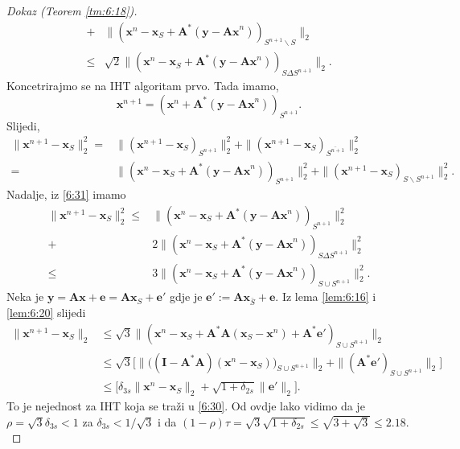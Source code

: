 \documentclass[a4paper,twoside,12pt]{memoir} %
\newcommand{\vect}[1]{\mathbf{#1}}
\renewcommand{\vec}{\vect}
\newcommand{\norm}[1]{\|{#1}\|}
\begin{document}
\begin{proof}[Dokaz (Teorem \ref{tm:6:18})]
\begin{align}
        + & \norm{(\vec x^n - \vec x_S + \vec A^*(\vec y - \vec{Ax}^n))_{S^{n+1} \backslash S}}_2 \nonumber \\
        \leq & \sqrt{2} \norm{(\vec x^n - \vec x_S + \vec A^*(\vec y - \vec{Ax}^n))_{S \Delta S^{n+1}}}_2.\label{6:31}
    \end{align}
    Koncetrirajmo se na IHT algoritam prvo. Tada imamo,
    \begin{equation*}
        \vec x^{n+1} = (\vec x^n + \vec A^*(\vec y - \vec{Ax}^n))_{S^{n+1}}.
    \end{equation*}
    Slijedi,
    \begin{align*}
        \norm{\vec x^{n+1} - \vec x_S}_2^2 = & \norm{(\vec x^{n+1} - \vec x_S)_{S^{n+1}}}_2^2 + \norm{(\vec x^{n+1} - \vec x_S)_{\overline{S^{n+1}}}}_2^2\\
        = & \norm{(\vec x^n - \vec x_S + \vec A^*(\vec y - \vec{Ax}^n))_{S^{n+1}}}_2^2 + \norm{(\vec x^{n+1} - \vec x_S)_{S \backslash S^{n+1}}}_2^2.
    \end{align*}
    Nadalje, iz \eqref{6:31} imamo
    \begin{align*}
        \norm{\vec x^{n+1} - \vec x_S}_2^2 \leq & \norm{(\vec x^n - \vec x_S + \vec A^*(\vec y - \vec{Ax}^n))_{S^{n+1}}}_2^2\\
        +&2\norm{(\vec x^n - \vec x_S + \vec A^*(\vec y - \vec{Ax}^n))_{S \Delta S^{n+1}}}_2^2 \\
        \leq & 3 \norm{(\vec x^n - \vec x_S + \vec A^* (\vec y - \vec{Ax}^n))_{S \cup S^{n+1}}}_2^2.
    \end{align*}
    Neka je $\vec y = \vec{Ax} + \vec e = \vec{Ax}_S + \vec e'$ gdje je $\vec e' := \vec {Ax}_{\bar S} + \vec e$. Iz lema \ref{lem:6:16} i \ref{lem:6:20} slijedi
    \begin{align*}
        \norm{\vec x^{n+1} - \vec x_S}_2 & \leq \sqrt{3} \norm{(\vec x^n - \vec x_S + \vec A^* \vec A (\vec x_S - \vec x^n) + \vec A^* \vec e')_{S \cup S^{n+1}}}_2\\ 
        & \leq \sqrt{3}\big[ \norm{ \big( (\vec I - \vec A^*\vec A)(\vec x^n - \vec x_S) \big)_{S \cup S^{n+1}}}_2 + \norm{(\vec A^*\vec e')_{S \cup S^{n+1}}}_2 \big]\\
        & \leq \big[ \delta_{3s}\norm{\vec x^n - \vec x_S}_2 + \sqrt{1+\delta_{2s}}\norm{\vec e'}_2 \big].
    \end{align*}
    To je nejednost za IHT koja se tra\v{z}i u \eqref{6:30}. Od ovdje lako vidimo da je $\rho = \sqrt{3}\delta_{3s} < 1$ za $\delta_{3s} < 1/\sqrt{3}$ i da $(1-\rho)\tau = \sqrt{3}\sqrt{1+\delta_{2s}} \leq \sqrt{3 + \sqrt{3}} \leq 2.18$.\\

\end{proof}
\end{document}
